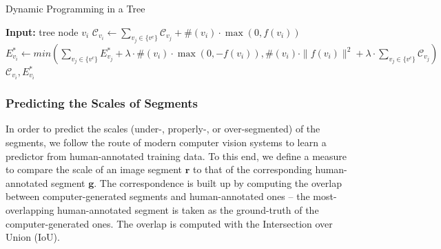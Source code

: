 \begin{algorithm}[tb]
\caption{Dynamic Programming in a Tree}
\label{ag:dp}
\begin{algorithmic}
\STATE \textbf{Input:} tree node $v_i$
\ELSE
\STATE $\mathcal{C}_{v_i} \gets  \sum_{v_j \in \{v^c\}}\mathcal{C}_{v_j} + \#(v_i) \cdot \max(0, f(v_i))$
\STATE $E^*_{v_i} \gets min(\sum_{v_j \in \{v^c\}}E^*_{v_j} + \lambda \cdot \#(v_i) \cdot \max(0, -f(v_i)), \#(v_i) \cdot \|f(v_i)\|^2 + \lambda \cdot \sum_{v_j \in \{v^c\}}\mathcal{C}_{v_j})$
\ENDIF
\RETURN $\mathcal{C}_{v_i},E^*_{v_i}$ 
\end{algorithmic}
\end{algorithm}

% 
% 

\subsubsection{Predicting the Scales of Segments}
\label{sec:scale}
In order to predict the scales (under-, properly-, or
over-segmented) of the segments, we follow the route of modern computer vision
systems to learn a predictor from human-annotated training data.
To this end, we define a measure to compare the scale of an image segment
$\mathbf{r}$ to that of the corresponding human-annotated segment
$\mathbf{g}$.
The correspondence is built up by computing the overlap between computer-generated segments and
human-annotated ones -- the most-overlapping human-annotated segment is taken as the
ground-truth of the computer-generated ones.
The overlap is computed with the Intersection over Union (IoU).


